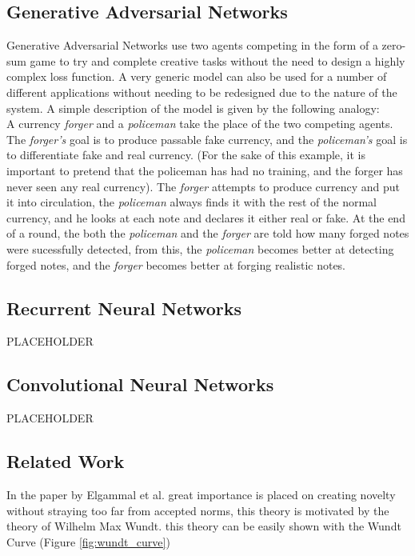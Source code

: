 \documentclass[10pt]{article}
\begin{document}
\subsection{Generative Adversarial Networks}
Generative Adversarial Networks \cite{Goodfellow2014} use two agents competing in the form of a zero-sum game to try and complete creative tasks without the need to design a highly complex loss function. A very generic model can also be used for a number of different applications without needing to be redesigned due to the nature of the system. A simple description of the model is given by the following analogy: \\
A currency {\it forger} and a {\it policeman} take the place of the two competing agents. The {\it forger's} goal is to produce passable fake currency, and the {\it policeman's} goal is to differentiate fake and real currency. (For the sake of this example, it is important to pretend that the policeman has had no training, and the forger has never seen any real currency). The {\it forger} attempts to produce currency and put it into circulation, the {\it policeman} always finds it with the rest of the normal currency, and he looks at each note and declares it either real or fake. At the end of a round, the both the {\it policeman} and the {\it forger} are told how many forged notes were sucessfully detected, from this, the {\it policeman} becomes better at detecting forged notes, and the {\it forger} becomes better at forging realistic notes.

\subsection{Recurrent Neural Networks}
PLACEHOLDER \cite{Zaremba2014} \cite{Shi2017} \cite{Lipton2015}

\subsection{Convolutional Neural Networks}
PLACEHOLDER \cite{Radford2015}

\subsection{Related Work}
In the paper by Elgammal et al. \cite{Elgammal2017} great importance is placed on creating novelty without straying too far from accepted norms, this theory is motivated by the theory of Wilhelm Max Wundt. \cite{Wundt1874} this theory can be easily shown with the Wundt Curve (Figure \ref{fig:wundt_curve})
\end{document}
